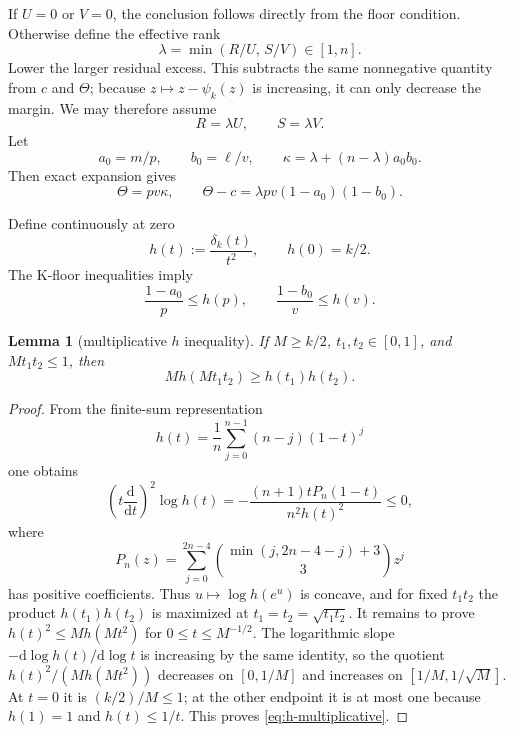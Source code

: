 \documentclass[11pt]{article}
\newtheorem{lemma}[theorem]{Lemma}
\theoremstyle{definition}
\theoremstyle{remark}
\begin{document}
If $U=0$ or $V=0$, the conclusion follows directly from the floor
condition.  Otherwise define the effective rank
\[
 \lambda=\min(R/U,\,S/V)\in[1,n].
\]
Lower the larger residual excess.  This subtracts the same nonnegative
quantity from $c$ and $\Theta$; because $z\mapsto z-\psi_k(z)$ is
increasing, it can only decrease the margin.  We may therefore assume
\begin{equation}\label{eq:KK-diagonal}
 R=\lambda U,\qquad S=\lambda V.
\end{equation}
Let
\[
 a_0=m/p,\qquad b_0=\ell/v,\qquad
 \kappa=\lambda+(n-\lambda)a_0b_0.
\]
Then exact expansion gives
\begin{equation}\label{eq:KK-T}
 \Theta=pv\kappa,\qquad \Theta-c=\lambda pv(1-a_0)(1-b_0).
\end{equation}

Define continuously at zero
\begin{equation}\label{eq:h-def}
 h(t):=\frac{\delta_k(t)}{t^2},\qquad h(0)=k/2.
\end{equation}
The K-floor inequalities imply
\begin{equation}\label{eq:h-floors}
 \frac{1-a_0}{p}\le h(p),\qquad
 \frac{1-b_0}{v}\le h(v).
\end{equation}

\begin{lemma}[multiplicative $h$ inequality]\label{lem:h-multiplicative}
If $M\ge k/2$, $t_1,t_2\in[0,1]$, and $Mt_1t_2\le1$, then
\begin{equation}\label{eq:h-multiplicative}
 M h(Mt_1t_2)\ge h(t_1)h(t_2).
\end{equation}
\end{lemma}

\begin{proof}
From the finite-sum representation
\[
 h(t)=\frac1n\sum_{j=0}^{n-1}(n-j)(1-t)^j
\]
one obtains
\[
 \left(t\frac{\mathrm d}{\mathrm d t}\right)^2\log h(t)
 =-\frac{(n+1)tP_n(1-t)}{n^2h(t)^2}\le0,
\]
where
\[
 P_n(z)=\sum_{j=0}^{2n-4}
 \binom{\min(j,2n-4-j)+3}{3}z^j
\]
has positive coefficients.  Thus $u\mapsto\log h(e^u)$ is concave, and
for fixed $t_1t_2$ the product $h(t_1)h(t_2)$ is maximized at
$t_1=t_2=\sqrt{t_1t_2}$.  It remains to prove
$h(t)^2\le M h(Mt^2)$ for $0\le t\le M^{-1/2}$.  The logarithmic
slope $-\mathrm d\log h(t)/\mathrm d\log t$ is increasing by the same identity, so the
quotient $h(t)^2/(M h(Mt^2))$ decreases on $[0,1/M]$ and increases
on $[1/M,1/\sqrt M]$.  At $t=0$ it is $(k/2)/M\le1$; at the other
endpoint it is at most one because $h(1)=1$ and $h(t)\le1/t$.  This
proves \eqref{eq:h-multiplicative}.
\end{proof}
\end{document}
